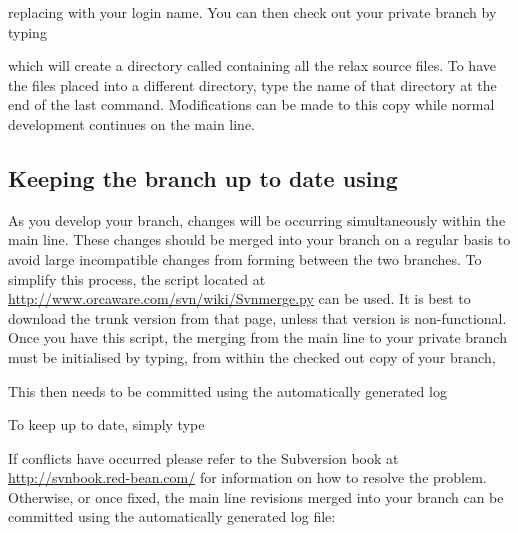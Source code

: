 replacing  with your login name.  You can then check out your private branch by typing


which will create a directory called  containing all the relax source files.  To have the files placed into a different directory, type the name of that directory at the end of the last command.  Modifications can be made to this copy while normal development continues on the main line.


\subsection{Keeping the branch up to date using }

As you develop your branch, changes will be occurring simultaneously within the main line.  These changes should be merged into your branch on a regular basis to avoid large incompatible changes from forming between the two branches.  To simplify this process, the  script located at \href{http://www.orcaware.com/svn/wiki/Svnmerge.py}{http://www.orcaware.com/svn/wiki/Svnmerge.py} can be used.  It is best to download the trunk version from that page, unless that version is non-functional.  Once you have this script, the merging from the main line to your private branch must be initialised by typing, from within the checked out copy of your branch,


This then needs to be committed using the automatically generated log


To keep up to date, simply type



If conflicts have occurred please refer to the Subversion book at \href{http://svnbook.red-bean.com/}{http://svnbook.red-bean.com/} for information on how to resolve the problem.  Otherwise, or once fixed, the main line revisions merged into your branch can be committed using the automatically generated log file:



